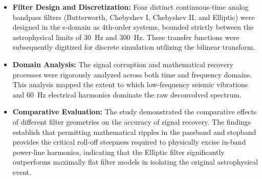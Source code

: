 \begin{itemize}
    \item \textbf{Filter Design and Discretization:} Four distinct continuous-time analog bandpass filters (Butterworth, Chebyshev I, Chebyshev II, and Elliptic) were designed in the s-domain as 4th-order systems, bounded strictly between the astrophysical limits of 30~Hz and 300~Hz. These transfer functions were subsequently digitized for discrete simulation utilizing the bilinear transform.
    \item \textbf{Domain Analysis:} The signal corruption and mathematical recovery processes were rigorously analyzed across both time and frequency domains. This analysis mapped the extent to which low-frequency seismic vibrations and 60~Hz electrical harmonics dominate the raw deconvolved spectrum.
    \item \textbf{Comparative Evaluation:} The study demonstrated the comparative effects of different filter geometries on the accuracy of signal recovery. The findings establish that permitting mathematical ripples in the passband and stopband provides the critical roll-off steepness required to physically excise in-band power-line harmonics, indicating that the Elliptic filter significantly outperforms maximally flat filter models in isolating the original astrophysical event.
\end{itemize}